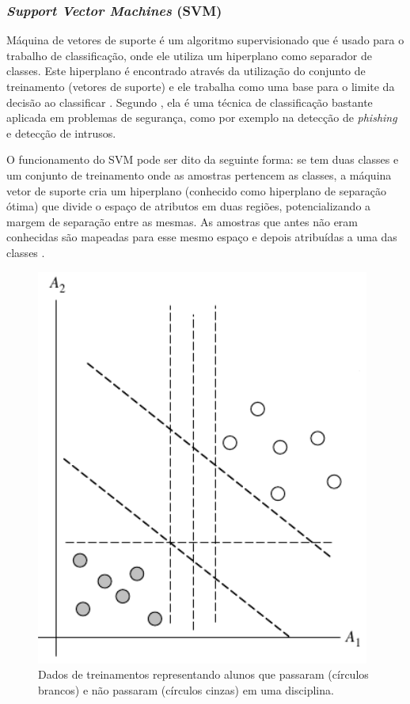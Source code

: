 \subsubsection{\textit{Support Vector Machines} (SVM)}

\par
Máquina de vetores de suporte é um algoritmo supervisionado que é usado para o trabalho de classificação, onde ele utiliza um hiperplano como separador de classes. Este hiperplano é encontrado através da utilização do conjunto de treinamento (vetores de suporte) e ele trabalha como uma base para o limite da decisão ao classificar \cite{Costa2012}. Segundo , ela é uma técnica de classificação bastante aplicada em problemas de segurança, como por exemplo na detecção de \textit{phishing} e detecção de intrusos.

\par
O funcionamento do SVM pode ser dito da seguinte forma: se tem duas classes e um conjunto de treinamento onde as amostras pertencem as classes, a máquina vetor de suporte cria um hiperplano (conhecido como hiperplano de separação ótima) que divide o espaço de atributos em duas regiões, potencializando a margem de separação entre as mesmas. As amostras que antes não eram conhecidas são mapeadas para esse mesmo espaço e depois atribuídas a uma das classes \cite{Henke2011}.

\begin{figure}[!htp]
	\begin{center}
    \caption{\label{fig:waveform_fig} Dados de treinamentos representando alunos que passaram (círculos brancos) e não passaram (círculos cinzas) em uma disciplina.}
	\includegraphics[scale=0.60]{Figuras/SVM.png}
	\end{center}
\end{figure}

